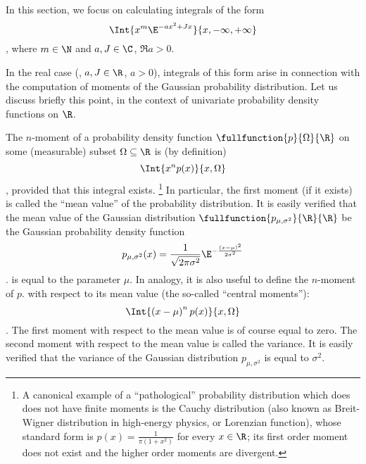 In this section, we focus on calculating integrals of the form
\begin{dmath*}
   \Int{ x^{m} \E^{ - ax^{2} + Jx} }{x, -\infty, +\infty}
\end{dmath*},
where $m\in\N$ and $a,J\in\C$, $\Re a>0$. 

In the real case (\ie, $a,J\in\R$, $a>0$), integrals of this form arise in
connection with the
computation of moments of the Gaussian probability distribution.
Let us discuss briefly this point, in the context of univariate 
probability density functions on $\R$.

The   $n$\ordth-moment of a
probability density function $\fullfunction{p}{\Omega}{\R}$
on some (measurable) subset $\Omega\subseteq\R$ is (by definition)
\begin{dmath*}
   \Int{ x^{n} p (x) }{x, \Omega}
\end{dmath*},
provided that this integral exists.%
\footnote{A canonical example of a ``pathological'' probability distribution
   which does does not have finite moments is the Cauchy distribution (also known as
   Breit-Wigner distribution in high-energy physics, or Lorenzian function),
   whose standard form is $p(x) = \frac{1}{\pi \left( 1+x^{2} \right)}$
   for every $x\in\R$; its first order moment does not exist and the higher
   order moments are divergent.}
In particular, the first moment (if it exists) is called the ``mean value'' of the probability
distribution.
It is easily verified that the mean value of the Gaussian distribution
$\fullfunction{p_{\mu,
   \sigma^{2}}}{\R}{\R}$ be the Gaussian probability density function 
\begin{dmath*}
   p_{\mu, \sigma^{2}}(x) = \frac{1}{\sqrt{2\pi\sigma^{2}}} \E^{ - \frac{\left(
	    x-\mu\right)^{2}}{2\sigma^{2}}} 
\end{dmath*}.
is equal to the parameter $\mu$.
In analogy, it is also useful to define the $n$\ordth-moment of $p$.
with respect to its mean value (the so-called ``central moments''):
\begin{dmath*}
   \Int{ \left( x-\mu\right)^{n} p (x) }{x,\Omega} 
\end{dmath*}.
The first moment with respect to the mean value is of course equal to zero.
The second moment with respect to the mean value is called the variance.
It is easily verified that the variance of the Gaussian distribution $p_{\mu,
   \sigma^{2}}$ is equal to $\sigma^{2}$.

